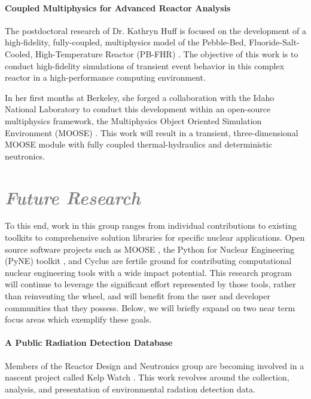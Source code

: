 \documentclass[a4paper, 12pt]{article}
\begin{document}
\paragraph{Coupled Multiphysics for Advanced Reactor Analysis}

The postdoctoral research of Dr. Kathryn Huff is focused on the development of a 
high-fidelity, fully-coupled, multiphysics model of the Pebble-Bed, 
Fluoride-Salt-Cooled, High-Temperature Reactor (PB-FHR) 
\cite{facilitators_fluoride-salt-cooled_2013, 
facilitators_fluoride-salt-cooled_2013-1, 
facilitators_fluoride-salt-cooled_2013-2, 
facilitators_fluoride-salt-cooled_2013-3}. The objective of this work is to 
conduct high-fidelity simulations of transient event behavior in this complex 
reactor in a high-performance computing environment.

In her first months at Berkeley, she forged a collaboration with the Idaho 
National Laboratory to conduct this development within an open-source 
multiphysics framework, the Multiphysics Object Oriented Simulation Environment 
(MOOSE) \cite{gaston_moose:_2009}. This work will result in a transient, 
three-dimensional MOOSE module with fully coupled thermal-hydraulics and 
deterministic neutronics.  


\section*{\textcolor{gray}{\it Future Research}}

To this end, work in this group ranges 
from individual contributions to existing toolkits to comprehensive solution 
libraries for specific nuclear applications. Open source software projects such as 
MOOSE \cite{gaston_moose:_2009}, the Python for Nuclear Engineering (PyNE) 
toolkit \cite{pyne_pyne_2011}, and Cyclus \cite{huff_cyclus_2011} are fertile ground for contributing computational nuclear engineering tools with a wide impact 
potential. This research program will continue to leverage the significant effort represented 
by those tools, rather than reinventing the wheel, and will benefit from the 
user and developer communities that they possess.  Below, we will briefly expand 
on two near term focus areas which exemplify these goals.  

\paragraph{A Public Radiation Detection Database}

Members of the Reactor Design and Neutronics group are becoming involved in a 
nascent project called Kelp Watch \cite{vetter_kelp_2013}. This work revolves 
around the collection, analysis, and presentation of environmental radation 
detection data. 
\end{document}
